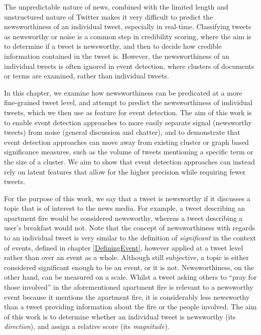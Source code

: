 
\label{sec:scoring:introduction}
The unpredictable nature of news, combined with the limited length and unstructured nature of Twitter makes it very difficult to predict the newsworthiness of an individual tweet, especially in real-time.
Classifying tweets as newsworthy or noise is a common step in credibility scoring, where the aim is to determine if a tweet is newsworthy, and then to decide how credible information contained in the tweet is.
However, the newsworthiness of an individual tweets is often ignored in event detection, where clusters of documents or terms are examined, rather than individual tweets.

In this chapter, we examine how newsworthiness can be predicated at a more fine-grained tweet level, and attempt to predict the newsworthiness of individual tweets, which we then use as feature for event detection.
The aim of this work is to enable event detection approaches to more easily separate signal (newsworthy tweets) from noise (general discussion and chatter), and to demonstrate that event detection approaches can move away from existing cluster or graph based significance measures, such as the volume of tweets mentioning a specific term or the size of a cluster.
We aim to show that event detection approaches can instead rely on latent features that allow for the higher precision while requiring fewer tweets.

For the purpose of this work, we say that a tweet is newsworthy if it discusses a topic that is of interest to the news media.
For example, a tweet describing an apartment fire would be considered newsworthy, whereas a tweet describing a user's breakfast would not.
Note that the concept of newsworthiness with regards to an individual tweet is very similar to the definition of \emph{significant} in the context of events, defined in chapter \ref{DefiningEvent}, however applied at a tweet level rather than over an event as a whole.
Although still subjective, a topic is either considered significant enough to be an event, or it is not.
Newsworthiness, on the other hand, can be measured on a scale.
Whilst a tweet asking others to ``pray for those involved'' in the aforementioned apartment fire is relevant to a newsworthy event because it mentions the apartment fire, it is considerably less newsworthy than a tweet providing information about the fire or the people involved.
The aim of this work is to determine whether an individual tweet is newsworthy (its \emph{direction}), and assign a relative score (its \emph{magnitude}).

